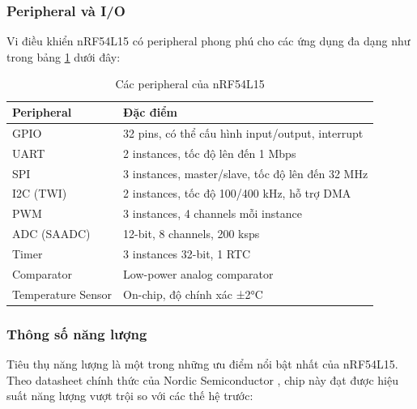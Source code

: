 \subsubsection{Peripheral và I/O}

Vi điều khiển nRF54L15 có peripheral phong phú cho các ứng dụng đa dạng như trong bảng \ref{tab:nrf54l15_peripherals} dưới đây:

\begin{table}[h!]
\centering
\caption{Các peripheral của nRF54L15}
\label{tab:nrf54l15_peripherals}
\begin{tabular}{|l|l|}
\hline
\textbf{Peripheral} & \textbf{Đặc điểm} \\
\hline
GPIO & 32 pins, có thể cấu hình input/output, interrupt \\
\hline
UART & 2 instances, tốc độ lên đến 1 Mbps \\
\hline
SPI & 3 instances, master/slave, tốc độ lên đến 32 MHz \\
\hline
I2C (TWI) & 2 instances, tốc độ 100/400 kHz, hỗ trợ DMA \\
\hline
PWM & 3 instances, 4 channels mỗi instance \\
\hline
ADC (SAADC) & 12-bit, 8 channels, 200 ksps \\
\hline
Timer & 3 instances 32-bit, 1 RTC \\
\hline
Comparator & Low-power analog comparator \\
\hline
Temperature Sensor & On-chip, độ chính xác ±2°C \\
\hline
\end{tabular}
\end{table}

\subsubsection{Thông số năng lượng}

Tiêu thụ năng lượng là một trong những ưu điểm nổi bật nhất của nRF54L15. Theo datasheet chính thức của Nordic Semiconductor \cite{nordic_nrf54l15_ps}, chip này đạt được hiệu suất năng lượng vượt trội so với các thế hệ trước:

